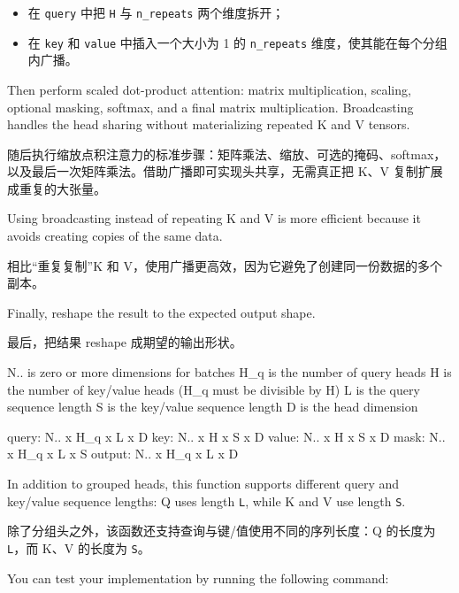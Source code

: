 \documentclass[11pt,a4paper]{article}
\newenvironment{zhpar}{%
  \par\smallskip\begingroup\color{zhcolor}\small\ignorespaces%
}{\endgroup\par\smallskip}
\begin{document}
\begin{zhpar}
\begin{itemize}[leftmargin=1.6em,itemsep=0.15em,parsep=0pt]
\item 在 \texttt{query} 中把 \texttt{H} 与 \texttt{n\_repeats} 两个维度拆开；
\item 在 \texttt{key} 和 \texttt{value} 中插入一个大小为 1 的 \texttt{n\_repeats} 维度，使其能在每个分组内广播。
\end{itemize}
\end{zhpar}
Then perform scaled dot-product attention: matrix multiplication, scaling, optional masking, softmax, and a final matrix multiplication. Broadcasting handles the head sharing without materializing repeated K and V tensors.

\begin{zhpar}
随后执行缩放点积注意力的标准步骤：矩阵乘法、缩放、可选的掩码、softmax，以及最后一次矩阵乘法。借助广播即可实现头共享，无需真正把 K、V 复制扩展成重复的大张量。
\end{zhpar}
Using broadcasting instead of repeating K and V is more efficient because it avoids creating copies of the same data.

\begin{zhpar}
相比“重复复制”K 和 V，使用广播更高效，因为它避免了创建同一份数据的多个副本。
\end{zhpar}
Finally, reshape the result to the expected output shape.

\begin{zhpar}
最后，把结果 reshape 成期望的输出形状。
\end{zhpar}
\begin{codeblock}
N.. is zero or more dimensions for batches
H_q is the number of query heads
H is the number of key/value heads (H_q must be divisible by H)
L is the query sequence length
S is the key/value sequence length
D is the head dimension

query: N.. x H_q x L x D
key: N.. x H x S x D
value: N.. x H x S x D
mask: N.. x H_q x L x S
output: N.. x H_q x L x D
\end{codeblock}

In addition to grouped heads, this function supports different query and key/value sequence lengths: Q uses length \texttt{L}, while K and V use length \texttt{S}.

\begin{zhpar}
除了分组头之外，该函数还支持查询与键/值使用不同的序列长度：Q 的长度为 \texttt{L}，而 K、V 的长度为 \texttt{S}。
\end{zhpar}
You can test your implementation by running the following command:
\end{document}

